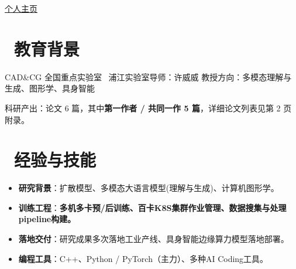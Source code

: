 \documentclass{resume}
\newcommand{\hl}[1]{\textbf{#1}}                    %
\begin{document}


\vspace{1ex}
{\href{https://dreaming-huang.github.io/}{个人主页}}

\section{\faGraduationCap\ 教育背景}

\vspace{-0.3ex}
{\small CAD\&CG 全国重点实验室 \textperiodcentered\ 浦江实验室\quad 导师：许威威 教授\quad 方向：多模态理解与生成、图形学、具身智能}\par
\vspace{0.2ex}
{\small 科研产出：论文 6 篇，其中\hl{第一作者 / 共同一作 5 篇}，详细论文列表见第 2 页附录。}\par


\section{\faCogs\ 经验与技能}
{\small
\begin{itemize}[parsep=0.2ex]
  \item \textbf{研究背景}：扩散模型、多模态大语言模型(理解与生成)、计算机图形学。
  \item \textbf{训练工程}：\hl{多机多卡预/后训练、百卡K8S集群作业管理、数据搜集与处理pipeline构建。}
  \item \textbf{落地交付}：研究成果多次落地工业产线、具身智能边缘算力模型落地部署。
  \item \textbf{编程工具}：C++、Python / PyTorch（主力）、多种AI Coding工具。
\end{itemize}
}
\end{document}
